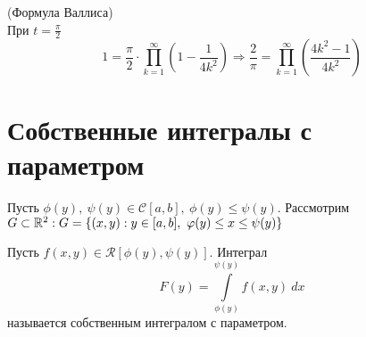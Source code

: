 \begin{consequense} (Формула Валлиса)\\
    При $t=\frac{\pi}{2}$
    \[1=\frac{\pi}{2}\cdot \prod\limits_{k=1}^{\infty}\left(1-\frac{1}{4k^2}\right) \Rightarrow \frac{2}{\pi}=\prod\limits_{k=1}^{\infty}\left(\frac{4k^2-1}{4k^2}\right)\]
\end{consequense}
\section{Собственные интегралы с параметром}
    Пусть $\phi(y),\ \psi(y)\in \mathcal{C}[a,b],\ \phi(y)\leq \psi(y)$. Рассмотрим $G\subset \mathbb{R}^2: G=\{(x,y): y\in [a,b],\ \varphi(y)\leq x\leq \psi(y)\}$
\begin{definition} Пусть $f(x,y)\in \mathcal{R}[\phi(y),\psi(y)]$. Интеграл
    \[F(y)=\int\limits_{\phi(y)}^{\psi(y)}f(x,y)\ dx\]
    называется собственным интегралом с параметром.
\end{definition}
